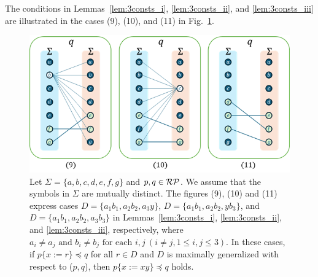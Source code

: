 The conditions in Lemmas~\ref{lem:3consts_i}, \ref{lem:3consts_ii}, and \ref{lem:3consts_iii} are illustrated in the cases (9), (10), and (11) in Fig.~\ref{fig:lem7bigraph}.

\begin{figure}[t]
  \begin{center}
    \includegraphics[scale=0.8]{figs/lem7bigraph.png}
    \caption{Let $\Sigma=\{a,b,c,d,e,f,g\}$ and $p,q \in \mathcal{RP}$. We assume that the symbols in $\Sigma$ are mutually distinct.
    The figures (9), (10) and (11) express cases $D = \{ a_{1}b_{1}, a_{2}b_{2}, a_{3}y \}$, $D = \{a_{1}b_{1}, a_{2}b_{2}, yb_{3}\}$, and $D = \{ a_{1}b_{1}, a_{2}b_{2}, a_{3}b_{3} \}$ in Lemmas~\ref{lem:3consts_i}, \ref{lem:3consts_ii}, and \ref{lem:3consts_iii}, respectively, where $a_{i} \ne a_{j} \mbox{ and } b_{i} \ne b_{j} \mbox{ for each } i,j~(i\ne j, 1\le i,j\le 3)$.
    In these cases, if $p \{ x := r \} \preceq q$ for all $r \in D$ and $D$ is maximally generalized {\color{red}with respect to} ($p,q$), then $p \{ x := xy \} \preceq q$ holds.}\label{fig:lem7bigraph}
  \end{center}
\end{figure}


